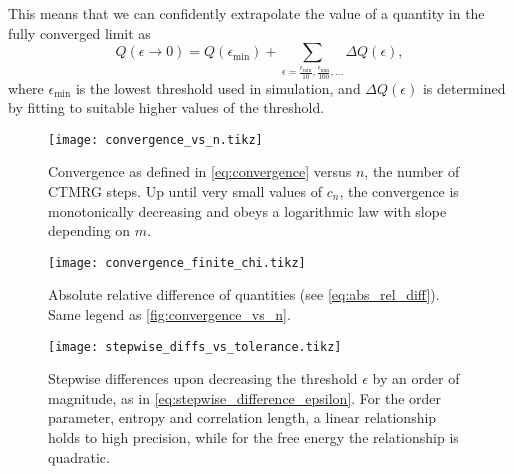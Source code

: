 This means that we can confidently extrapolate the value of a quantity in the fully converged limit as
\begin{equation}
  Q(\epsilon \to 0) = Q(\epsilon_{\text{min}}) + \sum_{\epsilon = \frac{\epsilon_{\text{min}}}{10},
  \frac{\epsilon_{\text{min}}}{100}, \dots} \Delta Q(\epsilon),
\end{equation}
where $\epsilon_{\text{min}}$ is the lowest threshold used in simulation, and $\Delta Q(\epsilon)$ is determined
by fitting to suitable higher values of the threshold.




\begin{figure}
  \texttt{[image: convergence\_vs\_n.tikz]}
  \caption{Convergence as defined in \autoref{eq:convergence} versus $n$, the number of CTMRG
  steps.
  Up until very small values of $c_n$, the convergence is monotonically decreasing and obeys
  a logarithmic law with slope depending on $m$.}\label{fig:convergence_vs_n}
\end{figure}

\begin{figure}
  \texttt{[image: convergence\_finite\_chi.tikz]}
  \caption{Absolute relative difference of quantities (see \autoref{eq:abs_rel_diff}).
  Same legend as \autoref{fig:convergence_vs_n}.}\label{fig:convergence_finite_chi}
\end{figure}


\begin{figure}
  \texttt{[image: stepwise\_diffs\_vs\_tolerance.tikz]}
  \caption{Stepwise differences upon decreasing the threshold $\epsilon$ by an order of magnitude,
  as in \autoref{eq:stepwise_difference_epsilon}.
  For the order parameter, entropy and correlation length, a linear relationship holds to high precision,
  while for the free energy the relationship is quadratic.}\label{fig:stepwise_diffs_vs_tolerance}
\end{figure}

